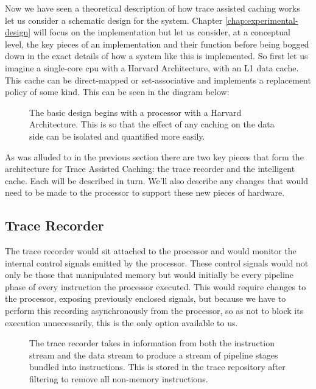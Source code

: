 Now we have seen a theoretical description of how trace assisted caching works let us consider a schematic design for the system. Chapter \ref{chap:experimental-design} will focus on the implementation but let us consider, at a conceptual level, the key pieces of an implementation and their function before being bogged down in the exact details of how a system like this is implemented. So first let us imagine a single-core \gls{cpu} with a Harvard Architecture, with an L1 data cache. This cache can be direct-mapped or set-associative and implements a replacement policy of some kind. This can be seen in the diagram below:

\begin{figure}
	
	\caption[Basic Processor Architecture]{The basic design begins with a processor with a Harvard Architecture. This is so that the effect of any caching on the data side can be isolated and quantified more easily.}
\end{figure}

As was alluded to in the previous section there are two key pieces that form the architecture for Trace Assisted Caching: the trace recorder and the intelligent cache. Each will be described in turn. We'll also describe any changes that would need to be made to the processor to support these new pieces of hardware.

\subsection{Trace Recorder}

The trace recorder would sit attached to the processor and would monitor the internal control signals emitted by the processor. These control signals would not only be those that manipulated memory but would initially be every pipeline phase of every instruction the processor executed. This would require changes to the processor, exposing previously enclosed signals, but because we have to perform this recording asynchronously from the processor, so as not to block its execution unnecessarily, this is the only option available to us.

\begin{figure}
	
	\caption[Basic Architecture with Trace Recorder]{The trace recorder takes in information from both the instruction stream and the data stream to produce a stream of pipeline stages bundled into instructions. This is stored in the trace repository after filtering to remove all non-memory instructions.}
\end{figure}

